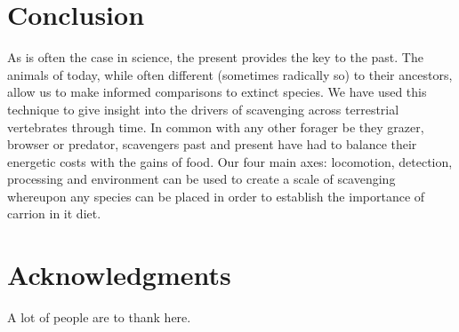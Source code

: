 \documentclass[a4paper,12pt]{article}
\begin{document}
\section*{Conclusion} 
As is often the case in science, the present provides the key to the past. The animals of today, while often different (sometimes radically so) to their ancestors, allow us to make informed comparisons to extinct species. 
We have used this technique to give insight into the drivers of scavenging across terrestrial vertebrates through time. In common with any other forager be they grazer, browser or predator, scavengers past and present have had to balance their energetic costs with the gains of food. 
Our four main axes: locomotion, detection, processing and environment can be used to create a scale of scavenging whereupon any species can be placed in order to establish the importance of carrion in it diet.  


\section*{Acknowledgments}

A lot of people are to thank here.


\newpage



\end{document}
